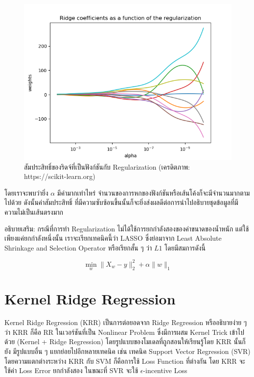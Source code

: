 \begin{figure}[H]
    \centering
    \includegraphics[width=0.8\linewidth]{fig/plot_ridge_regression.png}
    \caption{สัมประสิทธิ์ของริดจ์ที่เป็นฟังก์ชันกับ Regularization (เครดิตภาพ: https://scikit-learn.org)}
    \label{fig:ridge_res}
\end{figure}

\noindent โดยเราจะพบว่ายิ่ง $\alpha$ มีค่ามากเท่าไหร่ จำนวนของการหกของฟังก์ชันหรือเส้นโค้งก็จะมีจำนวนมากตามไปด้วย ดังนั้นค่าสัมประสิทธิ์
ที่มีความซับซ้อนขึ้นนั้นก็จะยิ่งส่งผลดีต่อการนำไปอธิบายชุดข้อมูลที่มีความไม่เป็นเส้นตรงมาก

อธิบายเสริม: กรณีที่การทำ Regularization ไม่ได้ใช้การยกกำลังสองของค่าขนาดของน้ำหนัก แต่ใช้เพียงแค่ยกกำลังหนึ่งนั้น เราจะเรียกเทคนิคนี้ว่า
LASSO ซึ่งย่อมาจาก Least Absolute Shrinkage and Selection Operator หรือเรียกสั้น ๆ ว่า $L1$ โดยมีสมการดังนี้

\begin{equation}
    \min_{w} \lVert X_{w} - y \rVert_{2}^{2} + \alpha \lVert w \rVert_{1}
\end{equation}

\section{Kernel Ridge Regression}

Kernel Ridge Regression (KRR) เป็นการต่อยอดจาก Ridge Regression หรืออธิบายง่าย ๆ ว่า KRR ก็คือ RR ในเวอร์ชันที่เป็น Nonlinear 
Problem ซึ่งมีการผสม Kernel Trick เข้าไปด้วย (Kernel + Ridge Regression) โดยรูปแบบของโมเดลที่ถูกสอนให้เรียนรู้โดย KRR นั้นก็ยัง%
มีรูปแบบอื่น ๆ แยกย่อยไปอีกหลายเทคนิค เช่น เทคนิค Support Vector Regression (SVR) โดยความแตกต่างระหว่าง KRR กับ SVM ก็คือการใช้
Loss Function ที่ต่างกัน โดย KRR จะใช้ค่า Loss Error ยกกำลังสอง ในขณะที่ SVR จะใช้ $\epsilon$-incentive Loss

